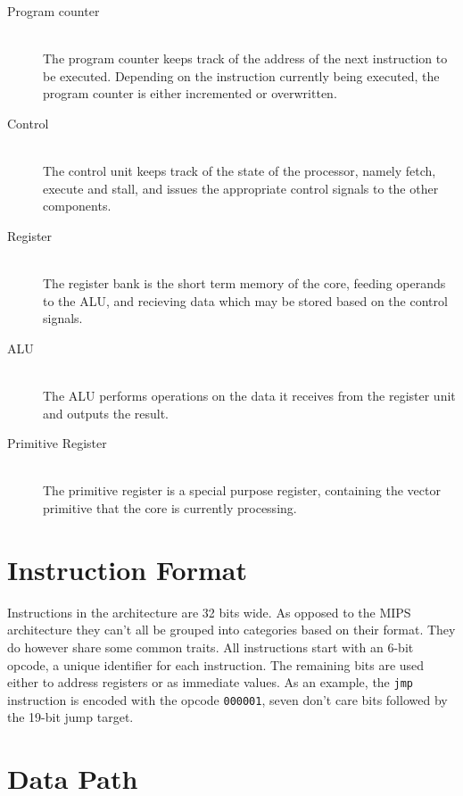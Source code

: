 \begin{description}
    \item[Program counter] \hfill \\
        The program counter keeps track of the address of the next instruction to be executed.
        Depending on the instruction currently being executed, the program counter is either incremented or overwritten.
    \item[Control] \hfill \\
        The control unit keeps track of the state of the processor, namely fetch, execute and stall, and issues the appropriate control signals to the other components.
    \item[Register] \hfill \\
        The register bank is the short term memory of the core, feeding operands to the ALU, and recieving data which may be stored based on the control signals.
    \item[ALU] \hfill \\
        The ALU performs operations on the data it receives from the register unit and outputs the result.
    \item[Primitive Register] \hfill \\
        The primitive register is a special purpose register, containing the vector primitive that the core is currently processing.
\end{description}

\section{Instruction Format}

Instructions in the \vthreek architecture are 32 bits wide.
As opposed to the MIPS architecture they can't all be grouped into categories based on their format.
They do however share some common traits.
All instructions start with an 6-bit opcode, a unique identifier for each instruction.
The remaining bits are used either to address registers or as immediate values.
As an example, the \texttt{jmp} instruction is encoded with the opcode \texttt{000001}, seven don't care bits followed by the 19-bit jump target.

\section{Data Path}

